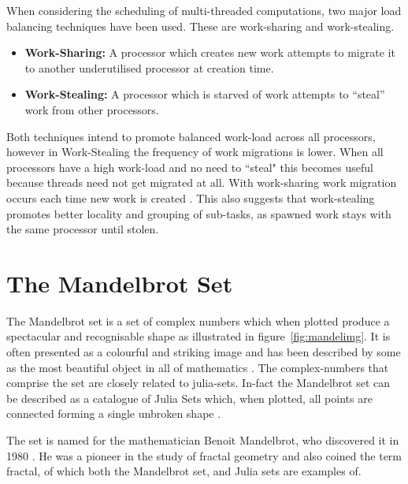 When considering the scheduling of multi-threaded computations, two major load balancing techniques have been used.
These are \gls{work-sharing} and \gls{work-stealing}.

\begin{itemize}
\item \textbf{Work-Sharing:} A processor which creates new work attempts to migrate it to another underutilised processor at creation time. 
\item \textbf{Work-Stealing:} A processor which is starved of work attempts to ``steal'' work from other processors. 
\end{itemize}

Both techniques intend to promote balanced work-load across all processors, however in Work-Stealing
the frequency of work migrations is lower. When all processors have a 
high work-load and no need to ``steal" this becomes useful because threads need not get 
migrated at all. With \gls{work-sharing} work migration occurs each time new work is created \cite{blumleis}.
This also suggests that \gls{work-stealing} promotes better \gls{locality} and grouping of sub-tasks, as spawned work 
stays with the same processor until stolen.

\section{The Mandelbrot Set}

The Mandelbrot set is a set of complex numbers which when plotted produce a spectacular and recognisable shape as illustrated in figure~\ref{fig:mandelimg}.
It is often presented as a colourful and striking image and has been described by some as the most beautiful object in all of mathematics 
\cite[p.~234]{chaosfract}.
The \glspl{complex-number} that comprise the set are closely related to julia-sets. 
In-fact the Mandelbrot set can be described as a catalogue of Julia Sets which, when plotted, all points are connected 
forming a single unbroken shape \cite[p.~177]{fractimg}.

The set is named for the mathematician Benoit Mandelbrot, who discovered it in 1980 \cite{fracnature , fractimg}. He was a pioneer in the study of 
fractal geometry and also coined the term \gls{fractal}, of which both the Mandelbrot set, and Julia sets are examples of. 

